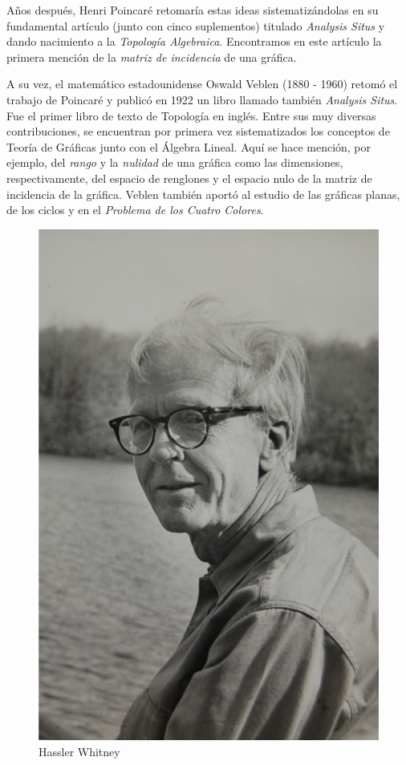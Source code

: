 Años después, Henri Poincaré retomaría estas ideas sistematizándolas en su fundamental artículo (junto con cinco suplementos) titulado \textit{Analysis Situs} y dando nacimiento a la \textit{Topología Algebraica}. Encontramos en este artículo la primera mención de la \textit{matriz de incidencia} de una gráfica.

A su vez, el matemático estadounidense Oswald Veblen (1880 - 1960) retomó el trabajo de Poincaré y publicó en 1922 un libro llamado también \textit{Analysis Situs}. Fue el primer libro de texto de Topología en inglés. Entre sus muy diversas contribuciones, se encuentran por primera vez sistematizados los conceptos de Teoría de Gráficas junto con el Álgebra Lineal. Aquí se hace mención, por ejemplo, del \textit{rango} y la \textit{nulidad} de una gráfica como las dimensiones, respectivamente, del espacio de renglones y el espacio nulo de la matriz de incidencia de la gráfica. Veblen también aportó al estudio de las gráficas planas, de los ciclos y en el \textit{Problema de los Cuatro Colores}.

\begin{figure}
\vspace{-0.9cm}
    \centering
    \includegraphics[scale=0.3]{img/imgintro/whitney.jpg}
    \caption{Hassler Whitney}
    \label{fig:veblen}
    \vspace{-0.5cm}
\end{figure}

